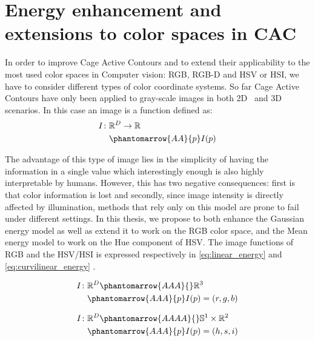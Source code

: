\newpage
\chapter{Energy enhancement and extensions to color spaces in CAC}
\label{sec:proposal}
\noindent

In order to improve Cage Active Contours and to extend their applicability to the most used color spaces in Computer vision: RGB, RGB-D and HSV or HSI, we have to consider different types of color coordinate systems. So far Cage Active Contours have only been applied to gray-scale images in both 2D~\cite{ipcac2015} and 3D~\cite{visapp2014} scenarios. In this case an image is a function defined as:
\begin{equation} \label{eq1:grayscale_image}
\begin{split}
I \colon & \mathbb{R}^{D} \to \mathbb{R} \\
& \phantomarrow{AA}{p} I(p) 
\end{split}
\end{equation}

The advantage of this type of image lies in the simplicity of having the information in a single value which interestingly enough is also highly interpretable by humans. However, this has two negative consequences: first is that color information is lost and secondly, since image intensity is directly affected by illumination, methods that rely only on this model are prone to fail under different settings. In this thesis, we propose to both enhance the Gaussian energy model as well as extend it to work on the RGB color space, and the Mean energy model to work on the Hue component of HSV. The image functions of RGB and the HSV/HSI is expressed respectively in \eqref{eq:linear_energy} and \eqref{eq:curvilinear_energy} .

\begin{equation} \label{eq:linear_energy}
\begin{split}
I \colon & \mathbb{R}^{D} \phantomarrow{AAA} {}  \mathbb{R}^3 \\
& \phantomarrow{AAA}{p} I(p)=(r,g,b)
\end{split}
\end{equation}

\begin{equation} \label{eq:curvilinear_energy}
\begin{split}
I \colon & \mathbb{R}^{D} \phantomarrow{AAAA} {}\mathbb{S}^1\times\mathbb{R}^2\\
& \phantomarrow{AAA}{p} I(p) =(h,s,i)
\end{split}
\end{equation}


